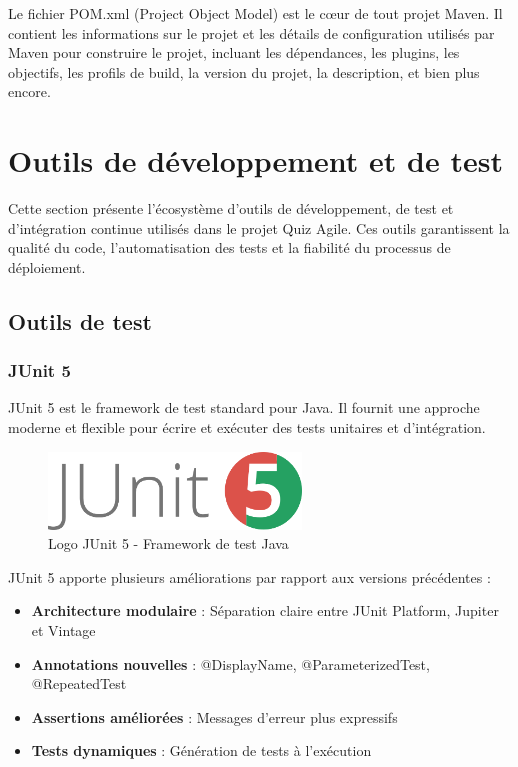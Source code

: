 \documentclass[12pt,a4paper]{report}
\begin{document}
Le fichier POM.xml (Project Object Model) est le cœur de tout projet Maven. Il contient les informations sur le projet et les détails de configuration utilisés par Maven pour construire le projet, incluant les dépendances, les plugins, les objectifs, les profils de build, la version du projet, la description, et bien plus encore.

\section{Outils de développement et de test}

Cette section présente l'écosystème d'outils de développement, de test et d'intégration continue utilisés dans le projet Quiz Agile. Ces outils garantissent la qualité du code, l'automatisation des tests et la fiabilité du processus de déploiement.

\subsection{Outils de test}

\subsubsection{JUnit 5}

JUnit 5 est le framework de test standard pour Java. Il fournit une approche moderne et flexible pour écrire et exécuter des tests unitaires et d'intégration.

\begin{figure}[htbp]
    \centering
    \includegraphics[width=0.6\textwidth]{latex_media/media/junit.png}
    \caption{Logo JUnit 5 - Framework de test Java}
    \label{fig:junit-logo}
\end{figure}

JUnit 5 apporte plusieurs améliorations par rapport aux versions précédentes :
\begin{itemize}
    \item \textbf{Architecture modulaire} : Séparation claire entre JUnit Platform, Jupiter et Vintage
    \item \textbf{Annotations nouvelles} : @DisplayName, @ParameterizedTest, @RepeatedTest
    \item \textbf{Assertions améliorées} : Messages d'erreur plus expressifs
    \item \textbf{Tests dynamiques} : Génération de tests à l'exécution
\end{itemize}
\end{document}
